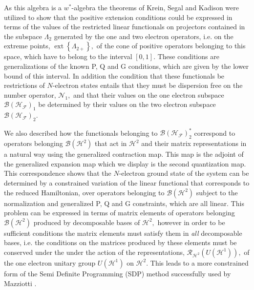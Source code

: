 \documentclass[aps,preprint]{revtex4}%
\begin{document}
As this algebra is a $w^{\ast}$-algebra the theorems of Krein, Segal and
Kadison were utilized to show that the positive extension conditions could be
expressed in terms of the values of the restricted linear functionals on
projectors contained in the subspace $\Lambda_{2}$ generated by the one and
two electron operators, i.e. on the extreme points, $\operatorname*{ext}%
\left\{  \Lambda_{2+}\right\}  ,$ of the cone of positive operators belonging
to this space, which have to belong to the interval $\left[  0,1\right]  .$
These conditions are generalizations of the known P, Q and G conditions, which
are given by the lower bound of this interval. In addition the condition that
these functionals be restrictions of $N$-electron states entails that they
must be dispersion free on the number operator, $\mathcal{N}_{1},$ and that
their values on the one electron subspace $\mathcal{B}\left(  \mathcal{H}%
_{\mathcal{F}}\right)  _{1}$ be determined by their values on the two electron
subspace $\mathcal{B}\left(  \mathcal{H}_{\mathcal{F}}\right)  _{2}$.

We also described how the functionals belonging to $\mathcal{B}\left(
\mathcal{H}_{\mathcal{F}}\right)  _{2}^{\ast}$ correspond to operators
belonging $\mathcal{B}\left(  \mathcal{H}^{2}\right)  $ that act in
$\mathcal{H}^{2}$ and their matrix representations in a natural way using the
generalized contraction map. This map is the adjoint of the generalized
expansion map which we display is the second quantization map. This
correspondence shows that the $N$-electron ground state of the system can be
determined by a constrained variation of the linear functional that
corresponds to the reduced Hamiltonian, over operators belonging to
$\mathcal{B}\left(  \mathcal{H}^{2}\right)  $ subject to the normalization and
generalized P, Q and G constraints, which are all linear. This problem can be
expressed in terms of matrix elements of operators belonging $\mathcal{B}%
\left(  \mathcal{H}^{2}\right)  $ produced by decomposable bases of
$\mathcal{H}^{2},$ however in order to be sufficient conditions the matrix
elements must satisfy them in \emph{all} decomposable bases, i.e. the
conditions on the matrices produced by these elements must be conserved under
the under the action of the representations, $\mathcal{R}_{\mathcal{H}^{2}%
}\left(  U\left(  \mathcal{H}^{1}\right)  \right)  ,$ of the one electron
unitary group $U\left(  \mathcal{H}^{1}\right)  $ on $\mathcal{H}^{2}.$ This
leads to a more constrained form of the Semi Definite Programming (SDP) method
successfully used by Mazziotti \cite{Mazziotti2011}.
\end{document}
